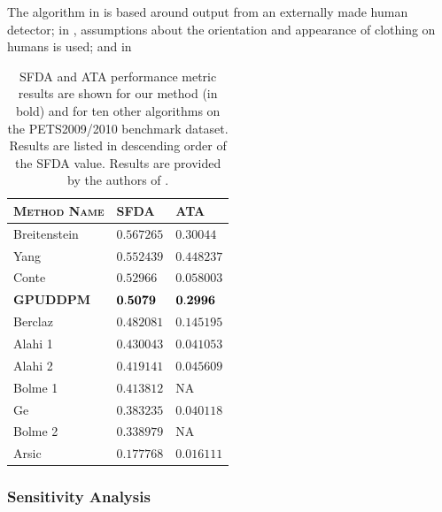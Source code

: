 \documentclass{article}
\begin{document}
The algorithm in \cite{breitenstein2009markovian} is based around output from an externally made human detector; in \cite{yang2009probabilistic}, assumptions about the orientation and appearance of clothing on humans is used; and in  




\begin{table}
\begin{tabular}[!] {| l | l | l |}
  \hline
  \textsc{Method Name} & \textsc{SFDA}  & \textsc{ATA} \\ \hline \hline
  Breitenstein \cite{breitenstein2009markovian} & $ 0.567265 $ & $0.30044$ \\ \hline
  Yang \cite{yang2009probabilistic} & $ 0.552439 $ & $0.448237$ \\ \hline
  Conte \cite{conte2010performance} & $ 0.52966  $ & $0.058003$ \\ \hline
  \textbf{GPUDDPM} & $ \bold{0.5079} $ & $\bold{0.2996}$ \\ \hline
  Berclaz \cite{berclaz2009multiple} & $ 0.482081 $ & $0.145195$ \\ \hline
  Alahi 1 \cite{alahi2009sparsity} & $ 0.430043 $ & $0.041053$ \\ \hline
  Alahi 2 \cite{alahi2009sparsity} & $ 0.419141 $ & $0.045609$ \\ \hline
  Bolme 1 \cite{bolme2009simple} & $ 0.413812 $ & NA \\ \hline
  Ge \cite{ge2009evaluation} & $ 0.383235 $ & $0.040118$ \\ \hline
  Bolme 2 \cite{bolme2009simple} & $ 0.338979 $ & NA \\ \hline
  Arsic \cite{arsic2009multi} & $ 0.177768 $ & $0.016111$ \\
  \hline
\end{tabular}
\caption{SFDA and ATA performance metric results are shown for our method (in bold) and for ten other algorithms on the PETS2009/2010 benchmark dataset. Results are listed in descending order of the SFDA value. Results are provided by the authors of \cite{ellis_2010}.}
\label{benchmark_results_table}
\end{table}



\subsubsection{Sensitivity Analysis}
\label{sec:sensitivityanalysis}
\end{document}
